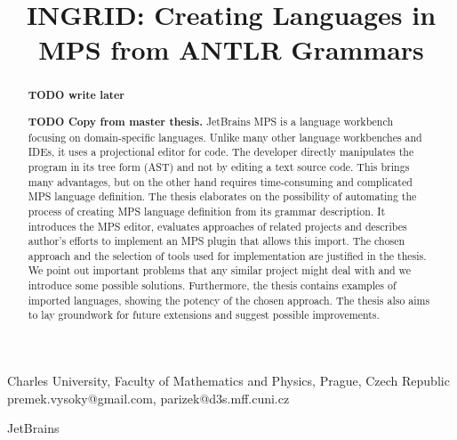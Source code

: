 \documentclass[10pt]{sigplanconf}
\newcommand{\todo}[1]{{\bfseries TODO #1}}
\begin{document}


\title{INGRID: Creating Languages in MPS from ANTLR Grammars}


	{Charles University, Faculty of Mathematics and Physics, Prague, Czech Republic}
	{premek.vysoky@gmail.com, parizek@d3s.mff.cuni.cz}

	{JetBrains}


\maketitle

\begin{abstract}
\todo{write later}

\todo{Copy from master thesis.}
JetBrains MPS is a language workbench focusing on domain-specific languages.
Unlike many other language workbenches and IDEs, it uses a projectional editor for code.
The developer directly manipulates the program in its tree form (AST) and not by editing a text source code.
This brings many advantages, but on the other hand requires time-consuming and complicated MPS language definition.
The thesis elaborates on the possibility of automating the process of creating MPS language definition from its grammar description.
It introduces the MPS editor, evaluates approaches of related projects and describes author's efforts to implement an MPS plugin that allows this import.
The chosen approach and the selection of tools used for implementation are justified in the thesis.
We point out important problems that any similar project might deal with and we introduce some possible solutions.
Furthermore, the thesis contains examples of imported languages, showing the potency of the chosen approach.
The thesis also aims to lay groundwork for future extensions and suggest possible improvements.
\end{abstract}








\end{document}
